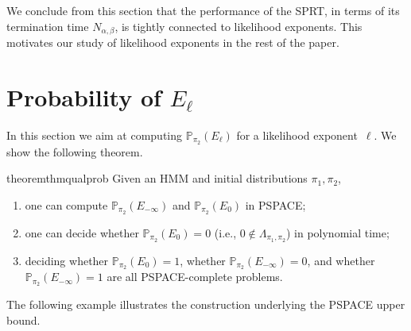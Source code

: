 \documentclass[a4paper,UKenglish,cleveref, autoref,mathscr]{lipics-v2019}
\newcommand{\PP}{\mathbb{P}}
\newcommand{\1}{\mathbbm{1}}
\begin{document}
We conclude from this section that the performance of the SPRT, in terms of its termination time $N_{\alpha,\beta}$, is tightly connected to likelihood exponents.
This motivates our study of likelihood exponents in the rest of the paper.

\section{Probability of $E_\ell$} \label{sec:qual}

In this section we aim at computing $\PP_{\pi_2}(E_\ell)$ for a likelihood exponent~$\ell$.
We show the following theorem.
\begin{restatable}{theorem}{thmqualprob} \label{thm:qual-prob}
Given an HMM and initial distributions $\pi_1, \pi_2$,
\begin{enumerate}
\item one can compute $\PP_{\pi_2}(E_{-\infty})$ and $\PP_{\pi_2}(E_0)$ in PSPACE;
\item one can decide whether $\PP_{\pi_2}(E_0)=0$ (i.e., $0 \not\in \Lambda_{\pi_1,\pi_2}$) in polynomial time;
\item deciding whether $\PP_{\pi_2}(E_0)=1$, whether $\PP_{\pi_2}(E_{-\infty})=0$, and whether $\PP_{\pi_2}(E_{-\infty})=1$ are all PSPACE-complete problems.
\end{enumerate}
\end{restatable}

The following example illustrates the construction underlying the PSPACE upper bound.
\end{document}
